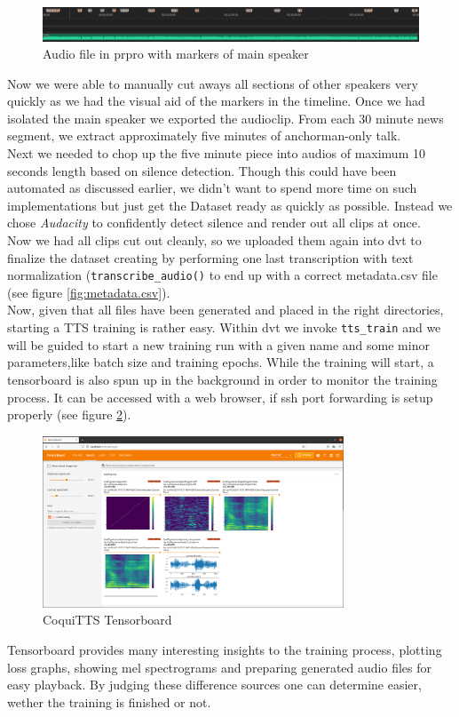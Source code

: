 \documentclass[
  a4paper,  %
  twoside,  %
  bibliography=totoc,
  headsepline,
  cleardoublepage=empty,
  parskip=half,
  draft=false
]{scrbook}
\begin{document}
\begin{figure}[h]
  \centering
  \includegraphics[width=1\textwidth]{./graphics/images/tts/premier with markers.png}
  \caption{Audio file in \gls{prpro} with markers of main speaker}
  \label{fig:premier-markers}
\end{figure}
Now we were able to manually cut aways all sections of other speakers very quickly as we had the visual aid of the markers in the timeline. Once we had isolated the main speaker we exported the audioclip. From each 30 minute news segment, we extract approximately five minutes of anchorman-only talk.\\
Next we needed to chop up the five minute piece into audios of maximum 10 seconds length based on silence detection. Though this could have been automated as discussed earlier, we didn't want to spend more time on such implementations but just get the Dataset ready as quickly as possible. Instead we chose \textit{Audacity} to confidently detect silence and render out all clips at once. \\
Now we had all clips cut out cleanly, so we uploaded them again into \gls{dvt} to finalize the dataset creating by performing one last transcription with text normalization (\verb|transcribe_audio()| to end up with a correct metadata.csv file (see figure \ref{fig:metadata.csv}). \\
Now, given that all files have been generated and placed in the right directories, starting a TTS training is rather easy. Within \gls{dvt} we invoke \verb|tts_train| and we will be guided to start a new training run with a given name and some minor parameters,like batch size and training epochs. While the training will start, a tensorboard is also spun up in the background in order to monitor the training process. It can be accessed with a web browser, if ssh port forwarding is setup properly (see figure \ref{fig:tensorboard}).
\begin{figure}[h]
  \centering
  \includegraphics[width=0.8\textwidth]{./graphics/images/tts/tensorboard.png}
  \caption{CoquiTTS Tensorboard \cite{TensorboardPngMbarnig2022}}
  \label{fig:tensorboard}
\end{figure}
Tensorboard provides many interesting insights to the training process, plotting loss graphs, showing mel spectrograms and preparing generated audio files for easy playback. By judging these difference sources one can determine easier, wether the training is finished or not. 
\end{document}
